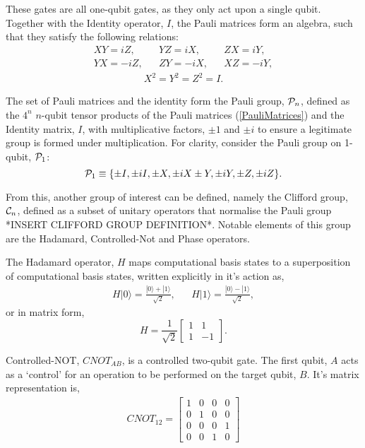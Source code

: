 These gates are all one-qubit gates, as they only act upon a single qubit.
Together with the Identity operator, $I$, the Pauli matrices form an algebra, such that they 
satisfy the following relations:
\begin{align}
    XY = iZ,  &  & YZ = iX,  &  & ZX = iY,  \\
    YX = -iZ, &  & ZY = -iX, &  & XZ = -iY,
\end{align}
\begin{align}
    X^2 = Y^2 = Z^2 = I.
\end{align}


The set of Pauli matrices and the identity form
the Pauli group, ${\cal P}_n$, defined as the $4^n$ $n$-qubit tensor products of the Pauli matrices (\ref{PauliMatrices}) and the
Identity matrix, $I$, with multiplicative factors, $\pm 1$ and $\pm i$ to ensure a legitimate group is formed under multiplication.
For clarity, consider the Pauli group on 1-qubit, ${\cal P}_1$:
\begin{equation}
    {\cal P}_1 \equiv \{ \pm I, \pm iI, \pm X, \pm iX \pm Y, \pm iY, \pm Z, \pm iZ\}.
\end{equation}



From this, another group of interest can be defined, namely the Clifford group, ${\cal C}_n$, defined as a
subset of unitary operators that normalise the Pauli group *INSERT CLIFFORD GROUP DEFINITION*.
Notable elements of this group are the Hadamard, Controlled-Not and Phase operators.

The Hadamard operator, $H$ maps computational basis states to a superposition of computational basis states, written explicitly 
in it's action as, 
\begin{align*}
    H|0\rangle = \frac{|0\rangle + |1\rangle}{\sqrt{2}}, && H|1\rangle = \frac{|0\rangle - |1\rangle}{\sqrt{2}},
\end{align*}
or in matrix form, 
\begin{equation}
    H = \frac{1}{\sqrt{2}} \begin{bmatrix}
        1 & 1\\
        1 & -1
    \end{bmatrix}.
\end{equation}

Controlled-NOT, $CNOT_{AB}$, is a controlled two-qubit gate. The first qubit, $A$ acts as a `control' for an operation to be 
performed on the target qubit, $B$. It's matrix representation is, 
\begin{align*}
    CNOT_{12} = \begin{bmatrix}
        1 & 0 & 0 & 0 \\
        0 & 1 & 0 & 0 \\
        0 & 0 & 0 & 1 \\
        0 & 0 & 1 & 0
        \end{bmatrix}
\end{align*}

